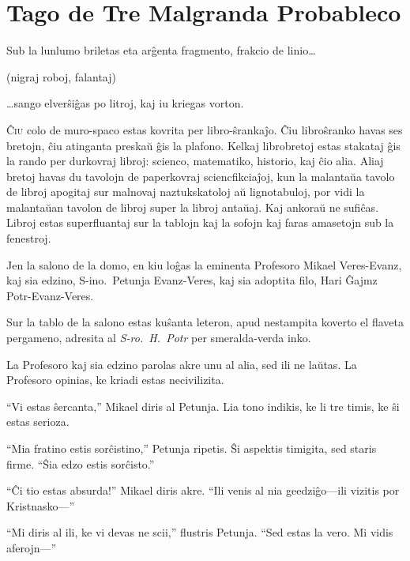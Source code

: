 \chapter{Tago de Tre Malgranda Probableco}

\begin{chapterOpeningQuote}
\noindent
Sub la lunlumo briletas eta arĝenta fragmento, frakcio de linio…

\vspace*{2ex}
(nigraj roboj, falantaj)

\vspace*{2ex}
…sango elverŝiĝas po litroj, kaj iu kriegas vorton.
\end{chapterOpeningQuote}

\lettrine{Ĉ}{iu} colo de muro-spaco estas kovrita per libro-ŝrankaĵo.
Ĉiu libroŝranko havas ses bretojn, ĉiu atinganta preskaŭ ĝis la plafono.
Kelkaj librobretoj estas stakataj ĝis la rando per durkovraj libroj: scienco, matematiko, historio, kaj ĉio alia.
Aliaj bretoj havas du tavolojn de paperkovraj sciencfikciaĵoj, kun la malantaŭa tavolo de libroj apogitaj sur malnovaj naztukskatoloj aŭ lignotabuloj, por vidi la malantaŭan tavolon de libroj super la libroj antaŭaj.
Kaj ankoraŭ ne sufiĉas.
Libroj estas superfluantaj sur la tablojn kaj la sofojn kaj faras amasetojn sub la fenestroj.

Jen la salono de la domo, en kiu loĝas la eminenta Profesoro Mikael Veres\nobreakdash-Evanz, kaj sia edzino, S\nobreakdash-ino.~Petunja Evanz\nobreakdash-Veres, kaj sia adoptita filo, Hari Ĝajmz Potr\nobreakdash-Evanz\nobreakdash-Veres.

Sur la tablo de la salono estas kuŝanta leteron, apud nestampita koverto el flaveta pergameno, adresita al \emph{S\nobreakdash-ro.~H.~Potr} per smeralda-verda inko.

La Profesoro kaj sia edzino parolas akre unu al alia, sed ili ne laŭtas.
La Profesoro opinias, ke kriadi estas necivilizita.

“Vi estas ŝercanta,” Mikael diris al Petunja.
Lia tono indikis, ke li tre timis, ke ŝi estas serioza.

“Mia fratino estis sorĉistino,” Petunja ripetis.
Ŝi aspektis timigita, sed staris firme.
“Ŝia edzo estis sorĉisto.”

“Ĉi tio estas absurda!” Mikael diris akre.
“Ili venis al nia geedziĝo—ili vizitis por Kristnasko—”

“Mi diris al ili, ke vi devas ne scii,” flustris Petunja.
“Sed estas la vero. Mi vidis aferojn—”

